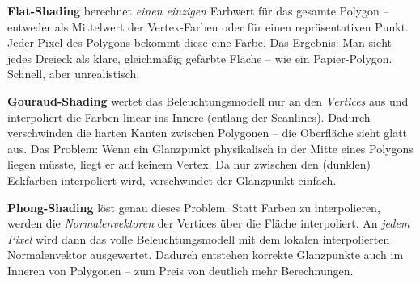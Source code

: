 \documentclass[12pt, a4paper]{article}
\begin{document}
\begin{figure}[H]
\end{figure}

\textbf{Flat-Shading} berechnet \textit{einen einzigen} Farbwert für das gesamte Polygon -- entweder als Mittelwert der Vertex-Farben oder für einen repräsentativen Punkt. Jeder Pixel des Polygons bekommt diese eine Farbe. Das Ergebnis: Man sieht jedes Dreieck als klare, gleichmäßig gefärbte Fläche -- wie ein Papier-Polygon. Schnell, aber unrealistisch.

\textbf{Gouraud-Shading} wertet das Beleuchtungsmodell nur an den \textit{Vertices} aus und interpoliert die Farben linear ins Innere (entlang der Scanlines). Dadurch verschwinden die harten Kanten zwischen Polygonen -- die Oberfläche sieht glatt aus. Das Problem: Wenn ein Glanzpunkt physikalisch in der Mitte eines Polygons liegen müsste, liegt er auf keinem Vertex. Da nur zwischen den (dunklen) Eckfarben interpoliert wird, verschwindet der Glanzpunkt einfach.

\textbf{Phong-Shading} löst genau dieses Problem. Statt Farben zu interpolieren, werden die \textit{Normalenvektoren} der Vertices über die Fläche interpoliert. An \textit{jedem Pixel} wird dann das volle Beleuchtungsmodell mit dem lokalen interpolierten Normalenvektor ausgewertet. Dadurch entstehen korrekte Glanzpunkte auch im Inneren von Polygonen -- zum Preis von deutlich mehr Berechnungen.
\end{document}
